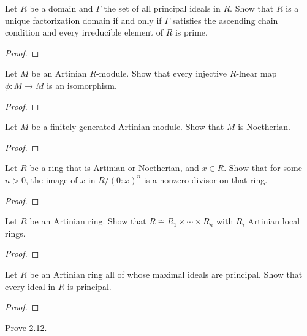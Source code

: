 \begin{problem}
Let $R$ be a domain and $\Gamma$ the set of all principal ideals
in $R$. Show that $R$ is a unique factorization domain if and
only if $\Gamma$ satisfies the ascending chain condition and
every irreducible element of $R$ is prime.
\end{problem}
\begin{proof}
\end{proof}
\newpage
\begin{problem}
Let $M$ be an Artinian $R$-module. Show that every injective
$R$-lnear map $\phi\colon M\to M$ is an isomorphism.
\end{problem}
\begin{proof}
\end{proof}
\newpage
\begin{problem}
Let $M$ be a finitely generated Artinian module. Show that $M$ is
Noetherian.
\end{problem}
\begin{proof}
\end{proof}
\newpage
\begin{problem}
Let $R$ be a ring that is Artinian or Noetherian, and $x\in
R$. Show that for some $n>0$, the image of $x$ in $R/(0:x)^n$ is
a nonzero-divisor on that ring.
\end{problem}
\begin{proof}
\end{proof}
\newpage
\begin{problem}
Let $R$ be an Artinian ring. Show that $R\cong
R_1\times\cdots\times R_n$ with $R_i$ Artinian local rings.
\end{problem}
\begin{proof}
\end{proof}
\newpage
\begin{problem}
Let $R$ be an Artinian ring all of whose maximal ideals are
principal. Show that every ideal in $R$ is principal.
\end{problem}
\begin{proof}
\end{proof}
\newpage
\begin{problem}
Prove 2.12.
\end{problem}
